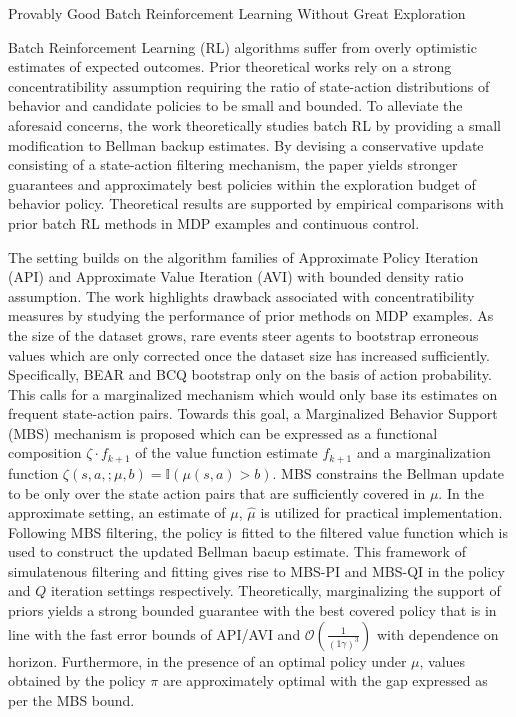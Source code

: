 \documentclass[11pt,letterpaper]{article}
\begin{document}
\begin{center}
  \large{Provably Good Batch Reinforcement Learning Without Great Exploration}
\end{center}

Batch Reinforcement Learning (RL) algorithms suffer from overly optimistic estimates of expected outcomes. Prior theoretical works rely on a strong concentratibility assumption requiring the ratio of state-action distributions of behavior and candidate policies to be small and bounded. To alleviate the aforesaid concerns, the work theoretically studies batch RL by providing a small modification to Bellman backup estimates. By devising a conservative update consisting of a state-action filtering mechanism, the paper yields stronger guarantees and approximately best policies within the exploration budget of behavior policy. Theoretical results are supported by empirical comparisons with prior batch RL methods in MDP examples and continuous control.

The setting builds on the algorithm families of Approximate Policy Iteration (API) and Approximate Value Iteration (AVI) with bounded density ratio assumption. The work highlights drawback associated with concentratibility measures by studying the performance of prior methods on MDP examples. As the size of the dataset grows, rare events steer agents to bootstrap erroneous values which are only corrected once the dataset size has increased sufficiently. Specifically, BEAR and BCQ bootstrap only on the basis of action probability. This calls for a marginalized mechanism which would only base its estimates on frequent state-action pairs. Towards this goal, a Marginalized Behavior Support (MBS) mechanism is proposed which can be expressed as a functional composition $\zeta \cdot f_{k+1}$ of the value function estimate $f_{k+1}$ and a marginalization function $\zeta(s,a,;\mu,b) = \mathbb{I}(\mu(s,a)>b)$. MBS constrains the Bellman update to be only over the state action pairs that are sufficiently covered in $\mu$. In the approximate setting, an estimate of $\mu$, $\hat{\mu}$ is utilized for practical implementation. Following MBS filtering, the policy is fitted to the filtered value function which is used to construct the updated Bellman bacup estimate. This framework of simulatenous filtering and fitting gives rise to MBS-PI and MBS-QI in the policy and $Q$ iteration settings respectively. Theoretically, marginalizing the support of priors yields a strong bounded guarantee with the best covered policy that is in line with the fast error bounds of API/AVI and $\mathcal{O}(\frac{1}{(1\gamma)^{3}})$ with dependence on horizon. Furthermore, in the presence of an optimal policy under $\mu$, values obtained by the policy $\pi$ are approximately optimal with the gap expressed as per the MBS bound. 
\end{document}
